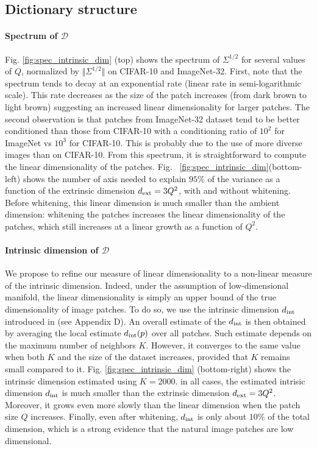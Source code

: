 \documentclass{article} %
\begin{document}
\subsection{Dictionary structure}
\label{structure}

\paragraph{Spectrum of $\mathcal{D}$}
Fig. \ref{fig:spec_intrinsic_dim} (top) shows the spectrum of $\Sigma^{1/2}$ for  several values of $Q$, normalized by $\Vert \Sigma^{1/2}\Vert$ on CIFAR-10 and ImageNet-32.  First, note that the spectrum tends to decay at an exponential rate (linear rate in semi-logarithmic scale). This rate decreases as the size of the patch increases (from dark brown to light brown) suggesting an increased linear dimensionality for larger patches. The second observation is that patches from ImageNet-32 dataset tend to be better conditioned than those from CIFAR-10 with a conditioning ratio of $10^2$ for ImageNet vs $10^3$ for CIFAR-10. This is probably due to the use of more diverse images than on CIFAR-10. From this spectrum, it is straightforward to compute the linear dimensionality of the patches. Fig.
~\ref{fig:spec_intrinsic_dim}(bottom-left) shows the number of axis needed to explain $95\%$ of the variance as a function of the extrinsic dimension $d_{\rm ext} = 3Q^2$, with and without whitening. Before whitening, this linear dimension is much smaller than the ambient dimension: whitening the patches increases the linear dimensionality of the patches, which still increases at a linear growth as a function of $Q^2$.


\paragraph{Intrinsic dimension of $\mathcal{D}$}
We propose to refine our measure of linear dimensionality to a non-linear measure of the intrinsic dimension. Indeed, under the assumption of low-dimensional manifold, the linear dimensionality is simply an upper bound of the true dimensionality of image patches.
To do so, we use the intrinsic dimension $d_{\rm int}$ introduced in \citep{Levina:2004} (see Appendix D).  
An overall estimate of the $d_{\rm int}$ is then obtained by averaging the local estimate $d_{\rm int}(p)$ over all patches. Such estimate depends on the maximum number of neighbors $K$. However, it converges to the same value when both $K$ and the size of the dataset  increases, provided that $K$ remains small compared to it. Fig. \ref{fig:spec_intrinsic_dim} (bottom-right) shows the intrinsic dimension estimated using $K=2000$.
in all cases, the estimated intrisic dimension $d_{\rm int}$ is much smaller than the extrinsic dimension $d_{\rm ext}=3Q^2$.
Moreover, it grows even more slowly than the linear dimension when the patch size $Q$ increases. Finally, even after whitening, $d_{\rm int}$ is only about $10\%$ of the total dimension, which is a strong evidence that the natural image patches are low dimensional.
\end{document}

